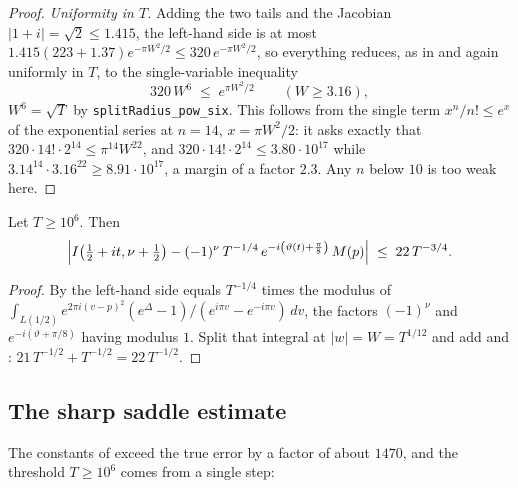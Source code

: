 \begin{proof}
\emph{Uniformity in $T$.}  Adding the two tails and the Jacobian $\lvert1+i\rvert=\sqrt2\le1.415$,
the left-hand side is at most $1.415(223+1.37)e^{-\pi W^{2}/2}\le320\,e^{-\pi W^{2}/2}$, so
everything reduces, as in  and again uniformly in $T$, to the
single-variable inequality
\[
  320\,W^{6}\;\le\;e^{\pi W^{2}/2}\qquad(W\ge3.16),
\]
$W^{6}=\sqrt T$ by \texttt{splitRadius\_pow\_six}.  This follows from the single term
$x^{n}/n!\le e^{x}$ of the exponential series at $n=14$, $x=\pi W^{2}/2$: it asks exactly that
$320\cdot14!\cdot2^{14}\le\pi^{14}W^{22}$, and $320\cdot14!\cdot2^{14}\le3.80\cdot10^{17}$ while
$3.14^{14}\cdot3.16^{22}\ge8.91\cdot10^{17}$, a margin of a factor $2.3$.  Any $n$ below $10$
is too weak here.
\end{proof}

\begin{theorem}
\label{thm:rsf_saddle}
\leanok
{}
Let $T\ge10^{6}$.  Then
\[
  \Bigl\lvert I\bigl(\tfrac12+it,\nu+\tfrac12\bigr)
    -(-1)^{\nu}\,T^{-1/4}\,e^{-i\left(\vartheta(t)+\frac\pi8\right)}\,M(p)\Bigr\rvert
  \;\le\;22\,T^{-3/4} .
\]
\end{theorem}

\begin{proof}
\leanok
{}
By  the left-hand side equals $T^{-1/4}$ times the modulus of
$\int_{L(1/2)}e^{2\pi i(v-p)^{2}}(e^{\Delta}-1)\bigl/(e^{i\pi v}-e^{-i\pi v})\,dv$, the factors
$(-1)^{\nu}$ and $e^{-i(\vartheta+\pi/8)}$ having modulus $1$.  Split that integral at
$\lvert w\rvert=W=T^{1/12}$ and add  and :
$21\,T^{-1/2}+T^{-1/2}=22\,T^{-1/2}$.
\end{proof}

\subsection{The sharp saddle estimate}
\label{sec:rsf_sharp}

The constants of  exceed the true error by a factor of about $1470$, and
the threshold $T\ge10^{6}$ comes from a single step:

